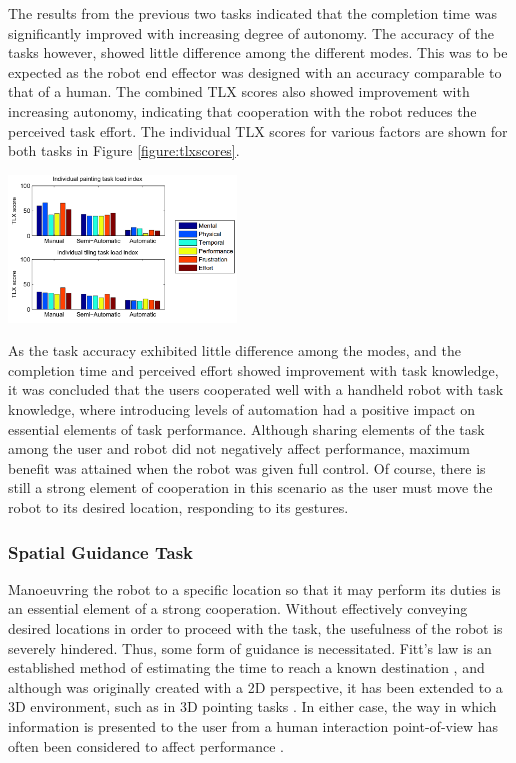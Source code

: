 \documentclass[11pt]{article}
\begin{document}
The results from the previous two tasks indicated that the completion time was significantly improved with increasing degree of autonomy. The accuracy of the tasks however, showed little difference among the different modes. This was to be expected as the robot end effector was designed with an accuracy comparable to that of a human. The combined TLX scores also showed improvement with increasing autonomy, indicating that cooperation with the robot reduces the perceived task effort. The individual TLX scores for various factors are shown for both tasks in Figure \ref{figure:tlxscores}.

\begin{center}
\includegraphics[width = 0.455\textwidth]{tlxscores.png}
\label{figure:tlxscores}
\end{center}

As the task accuracy exhibited little difference among the modes, and the completion time and perceived effort showed improvement with task knowledge, it was concluded that the users cooperated well with a handheld robot with task knowledge, where introducing levels of automation had a positive impact on essential elements of task performance. Although sharing elements of the task among the user and robot did not negatively affect performance, maximum benefit was attained when the robot was given full control. Of course, there is still a strong element of cooperation in this scenario as the user must move the robot to its desired location, responding to its gestures.
	
\subsubsection{Spatial Guidance Task}

Manoeuvring the robot to a specific location so that it may perform its duties is an essential element of a strong cooperation. Without effectively conveying desired locations in order to proceed with the task, the usefulness of the robot is severely hindered. Thus, some form of guidance is necessitated. Fitt's law is an established method of estimating the time to reach a known destination \cite{fitts1954}, and although was originally created with a 2D perspective, it has been extended to a 3D environment, such as in 3D pointing tasks \cite{Cha2013}. In either case, the way in which information is presented to the user from a human interaction point-of-view has often been considered to affect performance \cite{soukoreff2004} \cite{MOTOYUKI1995}. 
  
\end{document}

